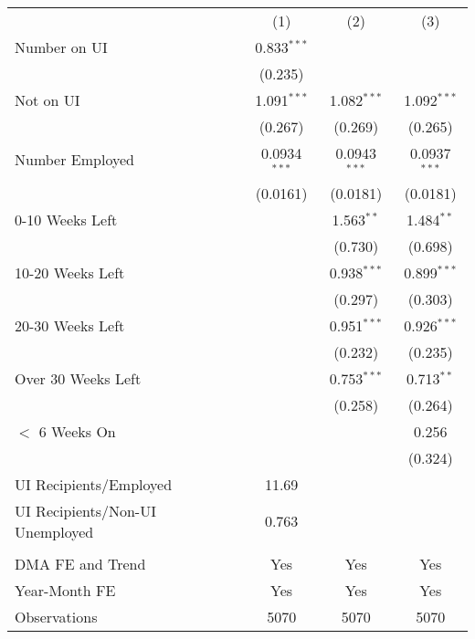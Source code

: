 
\begin{tabular}{l*{3}{c}}
\hline\hline
                    &\multicolumn{1}{c}{(1)}         &\multicolumn{1}{c}{(2)}         &\multicolumn{1}{c}{(3)}         \\
Number on UI        &       0.833$^{***}$&                     &                     \\
                    &     (0.235)         &                     &                     \\
Not on UI           &       1.091$^{***}$&       1.082$^{***}$&       1.092$^{***}$\\
                    &     (0.267)         &     (0.269)         &     (0.265)         \\
Number Employed     &      0.0934$^{***}$&      0.0943$^{***}$&      0.0937$^{***}$\\
                    &    (0.0161)         &    (0.0181)         &    (0.0181)         \\
0-10 Weeks Left     &                     &       1.563$^{**}$ &       1.484$^{**}$ \\
                    &                     &     (0.730)         &     (0.698)         \\
10-20 Weeks Left    &                     &       0.938$^{***}$&       0.899$^{***}$\\
                    &                     &     (0.297)         &     (0.303)         \\
20-30 Weeks Left    &                     &       0.951$^{***}$&       0.926$^{***}$\\
                    &                     &     (0.232)         &     (0.235)         \\
Over 30 Weeks Left  &                     &       0.753$^{***}$&       0.713$^{**}$ \\
                    &                     &     (0.258)         &     (0.264)         \\
$<$ 6 Weeks On      &                     &                     &       0.256         \\
                    &                     &                     &     (0.324)         \\
\hline
UI Recipients/Employed&       11.69         &                     &                     \\
UI Recipients/Non-UI Unemployed&       0.763         &                     &                     \\
\hline \vspace{-2mm}&                     &                     &                     \\
DMA FE and Trend    &         Yes         &         Yes         &         Yes         \\
Year-Month FE       &         Yes         &         Yes         &         Yes         \\
Observations        &        5070         &        5070         &        5070         \\
\hline\hline
\end{tabular}

